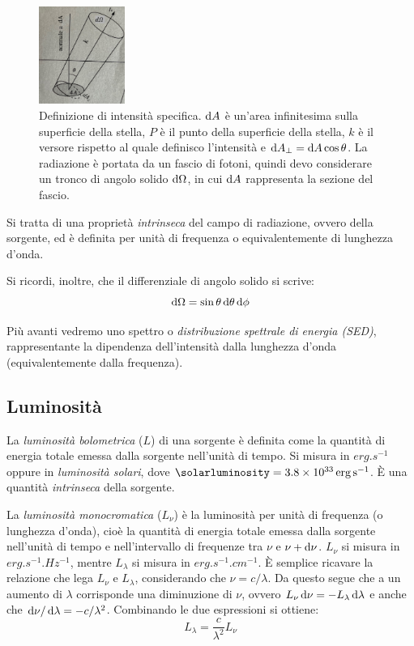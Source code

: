 \begin{figure}
\centering
\includegraphics[width=0.25\textwidth]{immagini/intensita-specifica.png}
\caption{Definizione di intensità specifica. $\mathop{\mathrm{{}d}}\mathopen{} A$ è un'area infinitesima sulla superficie della stella, $P$ è il punto della superficie della stella, $k$ è il versore rispetto al quale definisco l'intensità e $\mathop{\mathrm{{}d}}\mathopen{} A_\perp = \mathop{\mathrm{{}d}}\mathopen{} A \cos{\theta}$. La radiazione è portata da un fascio di fotoni, quindi devo considerare un tronco di angolo solido $\mathop{\mathrm{{}d}}\mathopen{} \Omega$, in cui $\mathop{\mathrm{{}d}}\mathopen{} A$ rappresenta la sezione del fascio.}
\label{fig:intensità-specifica}
\end{figure}

Si tratta di una proprietà \emph{intrinseca} del campo di radiazione, ovvero della sorgente, ed è definita per unità di frequenza o equivalentemente di lunghezza d'onda.

Si ricordi, inoltre, che il differenziale di angolo solido si scrive:
\begin{equation}\label{eq:angolo-solido}
    \mathop{\mathrm{{}d}}\mathopen{} \Omega = \sin{\theta} \mathop{\mathrm{{}d}}\mathopen{} \theta \mathop{\mathrm{{}d}}\mathopen{} \phi
\end{equation}

Più avanti vedremo uno spettro o \emph{distribuzione spettrale di energia (SED)}, rappresentante la dipendenza dell'intensità dalla lunghezza d'onda (equivalentemente dalla frequenza). 

\subsection{Luminosità}\label{sec:luminosità}
La \emph{luminosità bolometrica} ($L$) di una sorgente è definita come la quantità di energia totale emessa dalla sorgente nell'unità di tempo. Si misura in $\si{erg.s^{-1}}$ oppure in \emph{luminosità solari}, dove $\si{\solarluminosity} = \SI{3.8e33}{erg.s^{-1}}$. È una quantità \emph{intrinseca} della sorgente.

La \emph{luminosità monocromatica} ($L_\nu$) è la luminosità per unità di frequenza (o lunghezza d'onda), cioè la quantità di energia totale emessa dalla sorgente nell'unità di tempo e nell'intervallo di frequenze tra $\nu$ e $\nu + \mathop{\mathrm{{}d}}\mathopen{} \nu$. $L_\nu$ si misura in $\si{erg.s^{-1}.Hz^{-1}}$, mentre $L_\lambda$ si misura in $\si{erg.s^{-1}.cm^{-1}}$. È semplice ricavare la relazione che lega $L_\nu$ e $L_\lambda$, considerando che $\nu = c / \lambda$. Da questo segue che a un aumento di $\lambda$ corrisponde una diminuzione di $\nu$, ovvero $L_\nu \mathop{\mathrm{{}d}}\mathopen{} \nu = - L_\lambda \mathop{\mathrm{{}d}}\mathopen{} \lambda$ e anche che $\mathop{\mathrm{{}d}}\mathopen{} \nu / \mathop{\mathrm{{}d}}\mathopen{} \lambda = - c / \lambda^2$. Combinando le due espressioni si ottiene:
\begin{equation}\label{eq:luminosità-monocromatica}
    L_\lambda = \frac{c}{\lambda^2} L_\nu
\end{equation}

